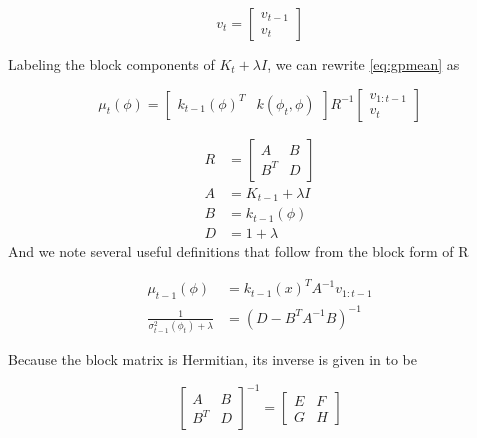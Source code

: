 \documentclass{amsart}
\begin{document}
\begin{equation}
    v_t = 
    \begin{bmatrix}
        v_{t-1} \\
        v_t
    \end{bmatrix}
\end{equation}
\smallskip

Labeling the block components of $K_t+\lambda I$, we can rewrite \eqref{eq:gpmean} as

\begin{equation}
    \mu_t(\phi) =
    \begin{bmatrix}
        k_{t-1}(\phi)^T & k(\phi_t,\phi)
    \end{bmatrix}
    R^{-1}
    \begin{bmatrix}
        v_{1:t-1} \\
        v_t
    \end{bmatrix}
    \label{eq:gpmeanblock}
\end{equation}

\begin{align}
    R&=
    \begin{bmatrix}
        A & B \\
        B^T & D
    \end{bmatrix}
    \nonumber \\
    A &= K_{t-1}+\lambda I \nonumber \\
    B &= k_{t-1}(\phi) \nonumber \\
    D &= 1+\lambda \nonumber
\end{align}
\smallskip
And we note several useful definitions that follow from the block form of R

\begin{align}
    \mu_{t-1}(\phi) &= k_{t-1}(x)^T A^{-1} v_{1:t-1} \label{eq:blockdefmu}\\ 
    \frac{1}{\sigma_{t-1}^2(\phi_t)+\lambda} &= (D-B^T A^{-1}B)^{-1} \label{eq:blockdefsig}
\end{align}
\smallskip

Because the block matrix is Hermitian, its inverse is given in \cite{lu02} to be

\begin{equation}
    \begin{bmatrix}
        A & B \\
        B^T & D
    \end{bmatrix}^{-1}
    =
    \begin{bmatrix}
        E & F \\
        G & H
    \end{bmatrix}
    \label{eq:blockinverse}
\end{equation}
\end{document}
